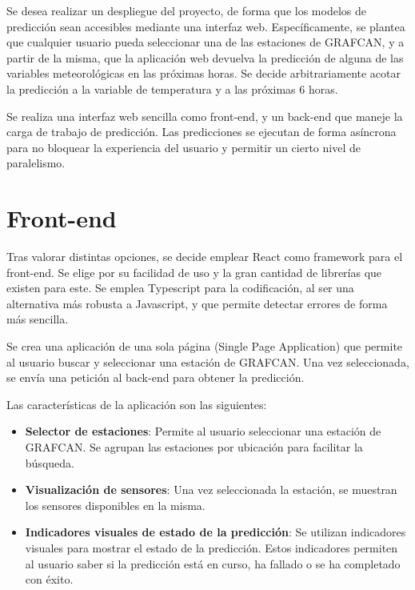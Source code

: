 
Se desea realizar un despliegue del proyecto, de forma que los modelos de predicción sean accesibles mediante una interfaz web. Específicamente, se plantea que cualquier usuario 
pueda seleccionar una de las estaciones de GRAFCAN, y a partir de la misma, que la aplicación web devuelva la predicción de alguna de las variables meteorológicas en las próximas horas. 
Se decide arbitrariamente acotar la predicción a la variable de temperatura y a las próximas 6 horas.

Se realiza una interfaz web sencilla como front-end, y un back-end que maneje la carga de trabajo de predicción. Las predicciones se ejecutan de forma asíncrona 
para no bloquear la experiencia del usuario y permitir un cierto nivel de paralelismo.

\section{Front-end}
Tras valorar distintas opciones, se decide emplear React como framework para el front-end. Se elige por su facilidad de uso y la gran cantidad de librerías que existen para este.
Se emplea Typescript para la codificación, al ser una alternativa más robusta a Javascript, y que permite detectar errores de forma más sencilla.

Se crea una aplicación de una sola página (Single Page Application) que permite al usuario buscar y seleccionar una estación de GRAFCAN. Una vez seleccionada,
se envía una petición al back-end para obtener la predicción.

Las características de la aplicación son las siguientes:
\begin{itemize}
    \item \textbf{Selector de estaciones}: Permite al usuario seleccionar una estación de GRAFCAN. Se agrupan las estaciones por ubicación para facilitar la búsqueda.
    \item \textbf{Visualización de sensores}: Una vez seleccionada la estación, se muestran los sensores disponibles en la misma. 
    \item \textbf{Indicadores visuales de estado de la predicción}: Se utilizan indicadores visuales para mostrar el estado de la predicción. Estos indicadores permiten al usuario saber si la predicción está en curso, ha fallado o se ha completado con éxito.
\end{itemize}


